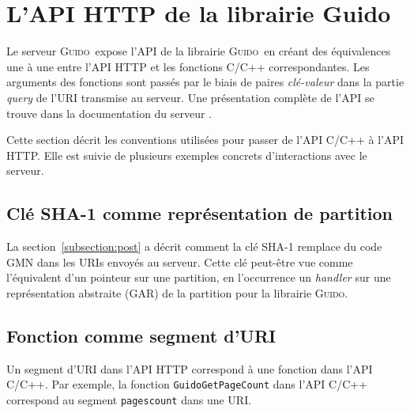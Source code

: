 \documentclass{article}
\newcommand{\guido}		{\textsc{Guido}}
\begin{document}
\section{L'API HTTP de la librairie Guido}\label{section:guido-api}
Le serveur \guido\ expose l'API de la librairie \guido\ en créant des équivalences une à une entre l'API HTTP et les fonctions C/C++ correspondantes. Les arguments des fonctions sont passés par le biais de paires \emph{clé-valeur} dans la partie \emph{query} de l'URI transmise au serveur. Une présentation complète de l'API se trouve dans la documentation du serveur \cite{guidoweb0.50}.\par

Cette section décrit les conventions utilisées pour passer de l'API C/C++ à l'API HTTP. Elle est suivie de plusieurs exemples concrets d'interactions avec le serveur. 

\subsection{Clé SHA-1 comme représentation de partition}
La section~\ref{subsection:post} a décrit comment la clé SHA-1 remplace du code GMN dans les URIs envoyés au serveur. Cette clé peut-être vue comme l'équivalent d'un pointeur sur une partition, en l'occurrence un \emph{handler} sur une représentation abstraite (GAR) de la partition pour la librairie \guido .


\subsection{Fonction comme segment d'URI}
Un segment d'URI dans l'API HTTP correspond à une fonction dans l'API C/C++. Par exemple, la fonction \verb=GuidoGetPageCount= dans l'API C/C++ correspond au segment \verb=pagescount= dans une URI.
\end{document}
